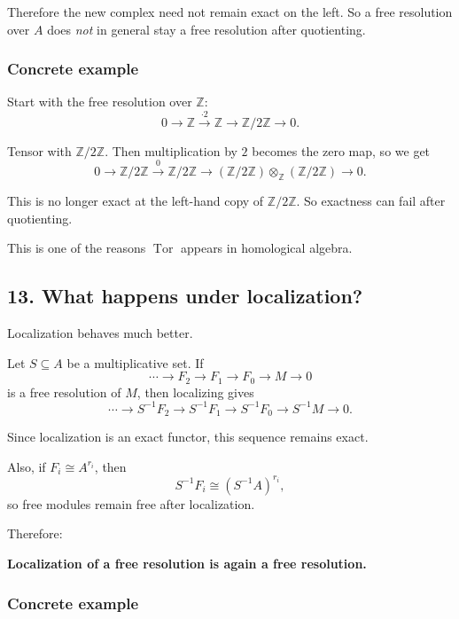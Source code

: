 \documentclass[12pt,a4paper]{article}
\theoremstyle{notespace}
\theoremstyle{definition}
\begin{document}
Therefore the new complex need not remain exact on the left. So a free resolution over \(A\) does \emph{not} in general stay a free resolution after quotienting.

\subsubsection*{Concrete example}

Start with the free resolution over \(\mathbb Z\):
\[
0 \longrightarrow \mathbb Z \xrightarrow{\cdot 2} \mathbb Z \longrightarrow \mathbb Z/2\mathbb Z \longrightarrow 0.
\]

Tensor with \(\mathbb Z/2\mathbb Z\). Then multiplication by \(2\) becomes the zero map, so we get
\[
0 \longrightarrow \mathbb Z/2\mathbb Z \xrightarrow{0} \mathbb Z/2\mathbb Z
\longrightarrow (\mathbb Z/2\mathbb Z)\otimes_{\mathbb Z}(\mathbb Z/2\mathbb Z) \longrightarrow 0.
\]

This is no longer exact at the left-hand copy of \(\mathbb Z/2\mathbb Z\). So exactness can fail after quotienting.

This is one of the reasons \(\operatorname{Tor}\) appears in homological algebra.

\subsection{13. What happens under localization?}

Localization behaves much better.

Let \(S\subseteq A\) be a multiplicative set. If
\[
\cdots \longrightarrow F_2 \longrightarrow F_1 \longrightarrow F_0 \longrightarrow M \longrightarrow 0
\]
is a free resolution of \(M\), then localizing gives
\[
\cdots \longrightarrow S^{-1}F_2 \longrightarrow S^{-1}F_1 \longrightarrow S^{-1}F_0
\longrightarrow S^{-1}M \longrightarrow 0.
\]

Since localization is an exact functor, this sequence remains exact.

Also, if \(F_i\cong A^{r_i}\), then
\[
S^{-1}F_i \cong (S^{-1}A)^{r_i},
\]
so free modules remain free after localization.

Therefore:

\medskip
\textbf{Localization of a free resolution is again a free resolution.}
\medskip

\subsubsection*{Concrete example}
\end{document}
